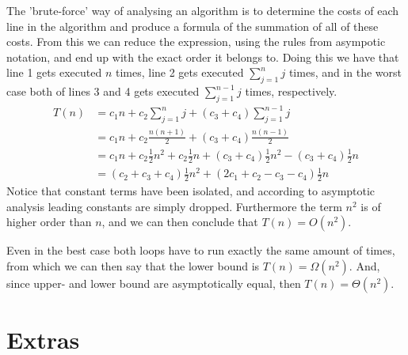 \documentclass[11pt,english]{article}
\begin{document}
The 'brute-force' way of analysing an algorithm is to determine the costs of
each line in the algorithm and produce a formula of the summation of all of
these costs. From this we can reduce the expression, using the rules from
asympotic notation, and end up with the exact order it belongs to. Doing this
we have that line 1 gets executed $n$ times, line 2 gets executed
$\sum^{n}_{j=1}{j}$ times, and in the worst case both of lines 3 and 4 gets
executed $\sum^{n-1}_{j=1}{j}$ times, respectively.
\begin{align}
	T(n) &= c_1 n + c_2 \sum^{n}_{j = 1}{j}
	+ (c_3 + c_4)\sum^{n - 1}_{j = 1}{j}\\
	&=
	c_1 n + c_2 \frac{n(n + 1)}{2}
	+ (c_3 + c_4)\frac{n(n - 1)}{2}\\
	&=
	c_1 n + c_2 \frac{1}{2} n^2 + c_2 \frac{1}{2} n +
	(c_3 + c_4) \frac{1}{2} n^2 - (c_3 + c_4) \frac{1}{2} n \\
	&=
	(c_2 + c_3 + c_4) \frac{1}{2} n^2 +
	(2 c_1 + c_2 - c_3 - c_4) \frac{1}{2} n
\end{align}
Notice that constant terms have been isolated, and according to asymptotic
analysis leading constants are simply dropped. Furthermore the term $n^2$ is
of higher order than $n$, and we can then conclude that $T(n) = O(n^2)$.

Even in the best case both loops have to run exactly the same amount of times,
from which we can then say that the lower bound is $T(n) = \Omega(n^2)$. And,
since upper- and lower bound are asymptotically equal, then
$T(n) = \Theta(n^2)$.






\newpage
\section*{Extras}
\end{document}
